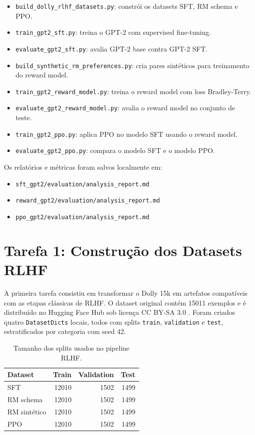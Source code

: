 \documentclass[a4paper,12pt]{article}
\begin{document}
\begin{itemize}
    \item \texttt{build\_dolly\_rlhf\_datasets.py}: constrói os datasets SFT, RM schema e PPO.
    \item \texttt{train\_gpt2\_sft.py}: treina o GPT-2 com supervised fine-tuning.
    \item \texttt{evaluate\_gpt2\_sft.py}: avalia GPT-2 base contra GPT-2 SFT.
    \item \texttt{build\_synthetic\_rm\_preferences.py}: cria pares sintéticos para treinamento do reward model.
    \item \texttt{train\_gpt2\_reward\_model.py}: treina o reward model com loss Bradley-Terry.
    \item \texttt{evaluate\_gpt2\_reward\_model.py}: avalia o reward model no conjunto de teste.
    \item \texttt{train\_gpt2\_ppo.py}: aplica PPO no modelo SFT usando o reward model.
    \item \texttt{evaluate\_gpt2\_ppo.py}: compara o modelo SFT e o modelo PPO.
\end{itemize}

Os relatórios e métricas foram salvos localmente em:

\begin{itemize}
    \item \texttt{sft\_gpt2/evaluation/analysis\_report.md}
    \item \texttt{reward\_gpt2/evaluation/analysis\_report.md}
    \item \texttt{ppo\_gpt2/evaluation/analysis\_report.md}
\end{itemize}

\section{Tarefa 1: Construção dos Datasets RLHF}

A primeira tarefa consistiu em transformar o Dolly 15k em artefatos compatíveis com as etapas clássicas de RLHF. O dataset original contém 15011 exemplos e é distribuído no Hugging Face Hub sob licença CC BY-SA 3.0 \cite{databricksDolly15k}. Foram criados quatro \texttt{DatasetDicts} locais, todos com splits \texttt{train}, \texttt{validation} e \texttt{test}, estratificados por categoria com seed 42.

\begin{table}[h]
\centering
\begin{tabular}{|l|r|r|r|}
\hline
\textbf{Dataset} & \textbf{Train} & \textbf{Validation} & \textbf{Test} \\
\hline
SFT & 12010 & 1502 & 1499 \\
RM schema & 12010 & 1502 & 1499 \\
RM sintético & 12010 & 1502 & 1499 \\
PPO & 12010 & 1502 & 1499 \\
\hline
\end{tabular}
\caption{Tamanho dos splits usados no pipeline RLHF.}
\end{table}
\end{document}
